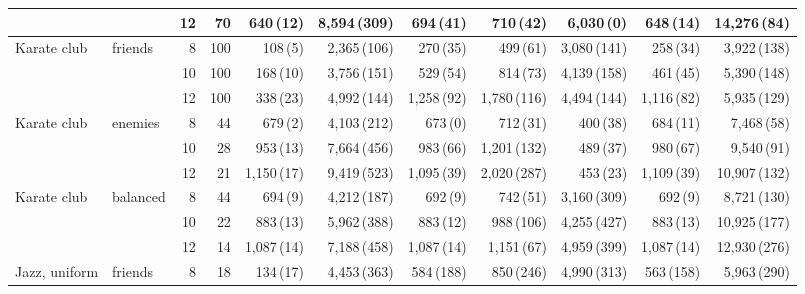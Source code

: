 \begin{table}[p]
{\begin{tabular}{llrrrrrrrrr}
 &  & 12 & 70 & 640\,{\scriptsize(12)} & 8,594\,{\scriptsize(309)} & 694\,{\scriptsize(41)} & 710\,{\scriptsize(42)} & 6,030\,{\scriptsize(0)} & 648\,{\scriptsize(14)} & 14,276\,{\scriptsize(84)} \\
\midrule
Karate club & friends & 8 & 100 & 108\,{\scriptsize(5)} & 2,365\,{\scriptsize(106)} & 270\,{\scriptsize(35)} & 499\,{\scriptsize(61)} & 3,080\,{\scriptsize(141)} & 258\,{\scriptsize(34)} & 3,922\,{\scriptsize(138)} \\
 &  & 10 & 100 & 168\,{\scriptsize(10)} & 3,756\,{\scriptsize(151)} & 529\,{\scriptsize(54)} & 814\,{\scriptsize(73)} & 4,139\,{\scriptsize(158)} & 461\,{\scriptsize(45)} & 5,390\,{\scriptsize(148)} \\
 &  & 12 & 100 & 338\,{\scriptsize(23)} & 4,992\,{\scriptsize(144)} & 1,258\,{\scriptsize(92)} & 1,780\,{\scriptsize(116)} & 4,494\,{\scriptsize(144)} & 1,116\,{\scriptsize(82)} & 5,935\,{\scriptsize(129)} \\
\addlinespace[1pt]
Karate club & enemies & 8 & 44 & 679\,{\scriptsize(2)} & 4,103\,{\scriptsize(212)} & 673\,{\scriptsize(0)} & 712\,{\scriptsize(31)} & 400\,{\scriptsize(38)} & 684\,{\scriptsize(11)} & 7,468\,{\scriptsize(58)} \\
 &  & 10 & 28 & 953\,{\scriptsize(13)} & 7,664\,{\scriptsize(456)} & 983\,{\scriptsize(66)} & 1,201\,{\scriptsize(132)} & 489\,{\scriptsize(37)} & 980\,{\scriptsize(67)} & 9,540\,{\scriptsize(91)} \\
 &  & 12 & 21 & 1,150\,{\scriptsize(17)} & 9,419\,{\scriptsize(523)} & 1,095\,{\scriptsize(39)} & 2,020\,{\scriptsize(287)} & 453\,{\scriptsize(23)} & 1,109\,{\scriptsize(39)} & 10,907\,{\scriptsize(132)} \\
\addlinespace[1pt]
Karate club & balanced & 8 & 44 & 694\,{\scriptsize(9)} & 4,212\,{\scriptsize(187)} & 692\,{\scriptsize(9)} & 742\,{\scriptsize(51)} & 3,160\,{\scriptsize(309)} & 692\,{\scriptsize(9)} & 8,721\,{\scriptsize(130)} \\
 &  & 10 & 22 & 883\,{\scriptsize(13)} & 5,962\,{\scriptsize(388)} & 883\,{\scriptsize(12)} & 988\,{\scriptsize(106)} & 4,255\,{\scriptsize(427)} & 883\,{\scriptsize(13)} & 10,925\,{\scriptsize(177)} \\
 &  & 12 & 14 & 1,087\,{\scriptsize(14)} & 7,188\,{\scriptsize(458)} & 1,087\,{\scriptsize(14)} & 1,151\,{\scriptsize(67)} & 4,959\,{\scriptsize(399)} & 1,087\,{\scriptsize(14)} & 12,930\,{\scriptsize(276)} \\
\midrule
Jazz, uniform & friends & 8 & 18 & 134\,{\scriptsize(17)} & 4,453\,{\scriptsize(363)} & 584\,{\scriptsize(188)} & 850\,{\scriptsize(246)} & 4,990\,{\scriptsize(313)} & 563\,{\scriptsize(158)} & 5,963\,{\scriptsize(290)} \\

\end{tabular}}
\end{table}
